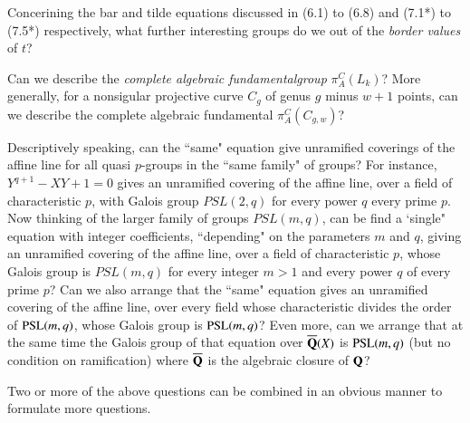 \begin{question}\label{art1-qus9.5}
Concerining the bar and tilde equations discussed in (6.1) to (6.8) and (7.1*) to (7.5*) respectively, what further interesting groups do we out of the \textit{border values} of $t$?
\end{question}

\begin{question}\label{art1-qus9.6}
Can we describe the \textit{complete algebraic fundamental\break group} $\pi^{C}_{A}(L_{k})$? More generally, for a nonsigular projective curve $C_{g}$ of genus $g$ minus $w+1$ points, can we describe the complete algebraic fundamental $\pi^{C}_{A}(C_{g,w})$?
\end{question}

\begin{question}\label{art1-qus9.7}
Descriptively speaking, can the ``same" equation give unramified coverings of the affine line for all quasi $p$-groups in the ``same family" of groups? For instance, $Y^{q+1}-XY+1 =0$ gives an unramified covering of the affine line, over a field of characteristic $p$, with Galois group $PSL(2,q)$ for every power $q$ every prime $p$. Now thinking of the larger family of groups $PSL(m,q)$, can be find a `single" equation with integer coefficients, ``depending" on the parameters $m$ and $q$, giving an unramified covering of the affine line, over a field of characteristic $p$, whose Galois group is $PSL(m,q)$ for every integer $m>1$ and every power $q$ of every prime $p$? Can we also arrange that the ``same" equation gives an unramified covering of the affine line, over every field whose characteristic divides the order of $\operatorname{PSL}(m,q)$, whose Galois group is $\operatorname{PSL}(m,q)$? Even more, can we arrange that at the same time the Galois group of that equation over $\overline{\mathbf{Q}}(X)$ is $\operatorname{PSL}(m,q)$ (but no condition on ramification) where $\overline{\mathbf{Q}}$ is the algebraic closure of $\mathbf{Q}$?
\end{question}

\setcounter{note}{7}
\begin{note}\label{art1-note9.8}
Two or more of the above questions can be combined in an obvious manner to formulate more questions.
\end{note}

